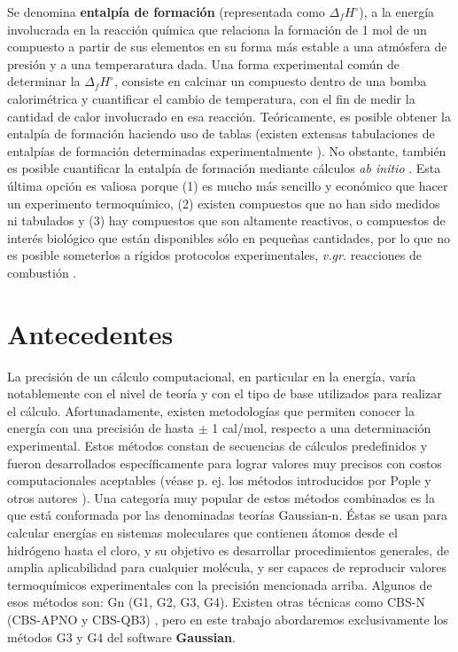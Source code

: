 \documentclass[12pt]{article}
\begin{document}
Se denomina \textbf{entalpía de formación} (representada como $\Delta_{f}H^{\circ}$), a la energía
involucrada en la reacción química que relaciona la formación de 1 mol de un compuesto a partir de sus elementos en su forma más estable a una atmósfera de presión y a una temperaratura dada.
Una forma experimental común de determinar la $\Delta_{f} H^{\circ}$, consiste en calcinar un compuesto dentro de una bomba calorimétrica y cuantificar el cambio de temperatura,
con el fin de medir la cantidad de calor involucrado en esa reacción. Teóricamente, es posible obtener la entalpía de formación haciendo uso de tablas (existen extensas tabulaciones de entalpías de formación determinadas experimentalmente  \cite{NIST1998, Tajti2004}). No obstante, también es posible cuantificar la entalpía de formación mediante cálculos \textit{ab initio}  \cite{Lewars2016}.
Esta última opción es valiosa porque (1) es mucho más sencillo y económico que hacer un experimento termoquímico, (2) existen compuestos que no han sido medidos ni tabulados y (3) hay compuestos que son altamente reactivos, o compuestos de interés biológico que están disponibles sólo en pequeñas cantidades, por lo que no es posible someterlos a rígidos protocolos experimentales, \textit{v.gr.} reacciones de combustión  \cite{Lewars2016}.

\section*{Antecedentes}
La precisión de un cálculo computacional, en particular en la energía, varía notablemente con el nivel de teoría y con el tipo de base utilizados para realizar el cálculo.
Afortunadamente, existen metodologías que permiten conocer la energía con una precisión de
hasta $\pm$ 1 cal/mol, respecto a una determinación experimental. Estos métodos constan de secuencias
de cálculos predefinidos y fueron desarrollados específicamente para lograr valores muy precisos
con costos computacionales aceptables (véase p. ej. los métodos introducidos por Pople y otros
autores  \cite{Cuevas2003}). Una categoría muy popular de estos métodos combinados es la que está
conformada por las denominadas teorías Gaussian-n.
Éstas se usan para calcular energías en sistemas moleculares que contienen átomos desde
el hidrógeno hasta el cloro, y su objetivo es desarrollar procedimientos generales,
de amplia aplicabilidad para cualquier molécula, y ser capaces de reproducir valores
termoquímicos experimentales con la precisión mencionada arriba.
Algunos de esos métodos son: Gn (G1, G2, G3, G4).  Existen otras técnicas como CBS-N
(CBS-APNO y CBS-QB3)  \cite{Simmie2015}, pero en este trabajo abordaremos exclusivamente
los métodos G3 y G4 del software \textbf{Gaussian}.
\end{document}
